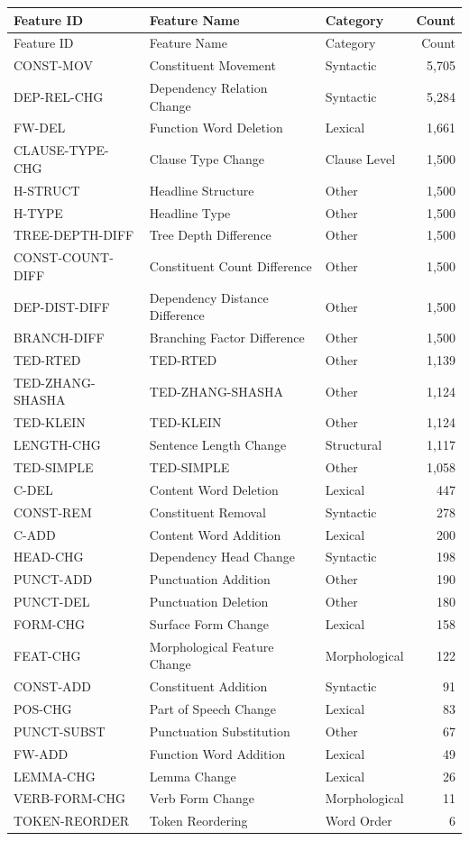\documentclass[11pt,a4paper]{article}
\begin{document}
\begin{longtable}{lllr}
\toprule
Feature ID & Feature Name & Category & Count \\
\midrule
\endfirsthead
\toprule
Feature ID & Feature Name & Category & Count \\
\midrule
\endhead
CONST-MOV & Constituent Movement & Syntactic & 5,705 \\
DEP-REL-CHG & Dependency Relation Change & Syntactic & 5,284 \\
FW-DEL & Function Word Deletion & Lexical & 1,661 \\
CLAUSE-TYPE-CHG & Clause Type Change & Clause Level & 1,500 \\
H-STRUCT & Headline Structure & Other & 1,500 \\
H-TYPE & Headline Type & Other & 1,500 \\
TREE-DEPTH-DIFF & Tree Depth Difference & Other & 1,500 \\
CONST-COUNT-DIFF & Constituent Count Difference & Other & 1,500 \\
DEP-DIST-DIFF & Dependency Distance Difference & Other & 1,500 \\
BRANCH-DIFF & Branching Factor Difference & Other & 1,500 \\
TED-RTED & TED-RTED & Other & 1,139 \\
TED-ZHANG-SHASHA & TED-ZHANG-SHASHA & Other & 1,124 \\
TED-KLEIN & TED-KLEIN & Other & 1,124 \\
LENGTH-CHG & Sentence Length Change & Structural & 1,117 \\
TED-SIMPLE & TED-SIMPLE & Other & 1,058 \\
C-DEL & Content Word Deletion & Lexical & 447 \\
CONST-REM & Constituent Removal & Syntactic & 278 \\
C-ADD & Content Word Addition & Lexical & 200 \\
HEAD-CHG & Dependency Head Change & Syntactic & 198 \\
PUNCT-ADD & Punctuation Addition & Other & 190 \\
PUNCT-DEL & Punctuation Deletion & Other & 180 \\
FORM-CHG & Surface Form Change & Lexical & 158 \\
FEAT-CHG & Morphological Feature Change & Morphological & 122 \\
CONST-ADD & Constituent Addition & Syntactic & 91 \\
POS-CHG & Part of Speech Change & Lexical & 83 \\
PUNCT-SUBST & Punctuation Substitution & Other & 67 \\
FW-ADD & Function Word Addition & Lexical & 49 \\
LEMMA-CHG & Lemma Change & Lexical & 26 \\
VERB-FORM-CHG & Verb Form Change & Morphological & 11 \\
TOKEN-REORDER & Token Reordering & Word Order & 6 \\
\bottomrule
\end{longtable}
\end{document}
